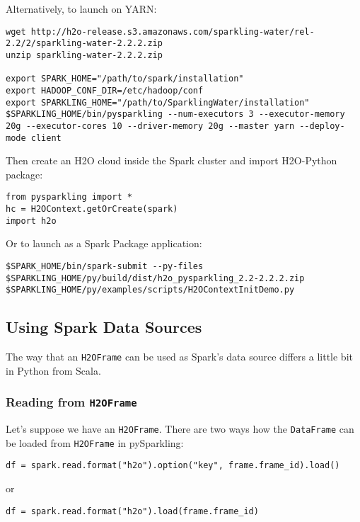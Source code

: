 Alternatively, to launch on YARN:

\begin{lstlisting}[style=Bash]
wget http://h2o-release.s3.amazonaws.com/sparkling-water/rel-2.2/2/sparkling-water-2.2.2.zip
unzip sparkling-water-2.2.2.zip
 
export SPARK_HOME="/path/to/spark/installation"
export HADOOP_CONF_DIR=/etc/hadoop/conf
export SPARKLING_HOME="/path/to/SparklingWater/installation"
$SPARKLING_HOME/bin/pysparkling --num-executors 3 --executor-memory 20g --executor-cores 10 --driver-memory 20g --master yarn --deploy-mode client
\end{lstlisting}
    
Then create an H2O cloud inside the Spark cluster and import H2O-Python package:
\begin{lstlisting}[style=Python]
from pysparkling import *
hc = H2OContext.getOrCreate(spark)
import h2o
\end{lstlisting}

Or to launch as a Spark Package application:
\begin{lstlisting}[style=Bash]
$SPARK_HOME/bin/spark-submit --py-files $SPARKLING_HOME/py/build/dist/h2o_pysparkling_2.2-2.2.2.zip
$SPARKLING_HOME/py/examples/scripts/H2OContextInitDemo.py
\end{lstlisting}


\subsection{Using Spark Data Sources}

The way that an \texttt{H2OFrame} can be used as Spark's data source differs a little bit in Python from Scala.

\subsubsection{Reading from \texttt{H2OFrame}}

Let's suppose we have an \texttt{H2OFrame}. There are two ways how the \texttt{DataFrame} can be loaded from \texttt{H2OFrame} in pySparkling:
\begin{lstlisting}[style=Scala]
df = spark.read.format("h2o").option("key", frame.frame_id).load()
\end{lstlisting}
or
\begin{lstlisting}[style=Scala]
df = spark.read.format("h2o").load(frame.frame_id)
\end{lstlisting}

